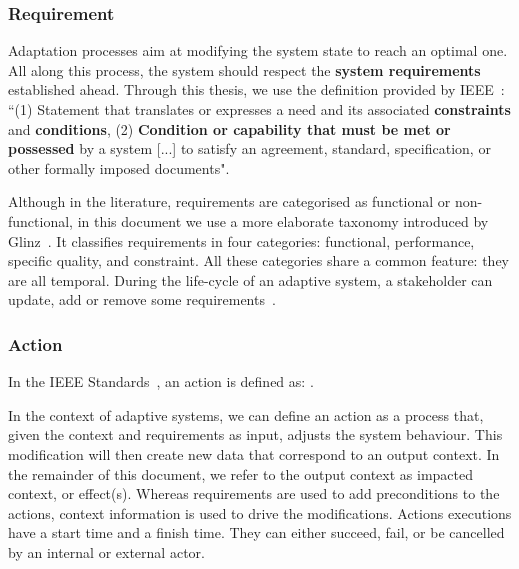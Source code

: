 \subsubsection{Requirement}
\label{sec:back:adapt:knowledge:req}

Adaptation processes aim at modifying the system state to reach an optimal one.
All along this process, the system should respect the \textbf{system requirements} established ahead. 
Through this thesis, we use the definition provided by IEEE~\cite{iso2017systems}: ``(1) Statement that translates or expresses a need and its associated \textbf{constraints} and \textbf{conditions}, (2) \textbf{Condition or capability that must be met or possessed} by a system [...] to satisfy an agreement, standard, specification, or other formally imposed documents".

Although in the literature, requirements are categorised as functional or non-func\-tional, in this document we use a more elaborate taxonomy introduced by Glinz~\cite{DBLP:conf/re/Glinz07}.
It classifies requirements in four categories: functional, performance, specific quality, and constraint.
All these categories share a common feature: they are all temporal.
During the life-cycle of an adaptive system, a stakeholder can update, add or remove some requirements~\cite{DBLP:conf/icse/ChengA07, pandey2010effective}.

\subsubsection{Action}
In the IEEE Standards~\cite{iso2017systems}, an action is defined as: .

In the context of adaptive systems, we can define an action as a process that, given the context and requirements as input, adjusts the system behaviour.
This modification will then create new data that correspond to an output context. In the remainder of this document, we refer to the output context as impacted context, or effect(s).
Whereas requirements are used to add preconditions to the actions, context information is used to drive the modifications.
Actions executions have a start time and a finish time. They can either succeed, fail, or be cancelled by an internal or external actor.


